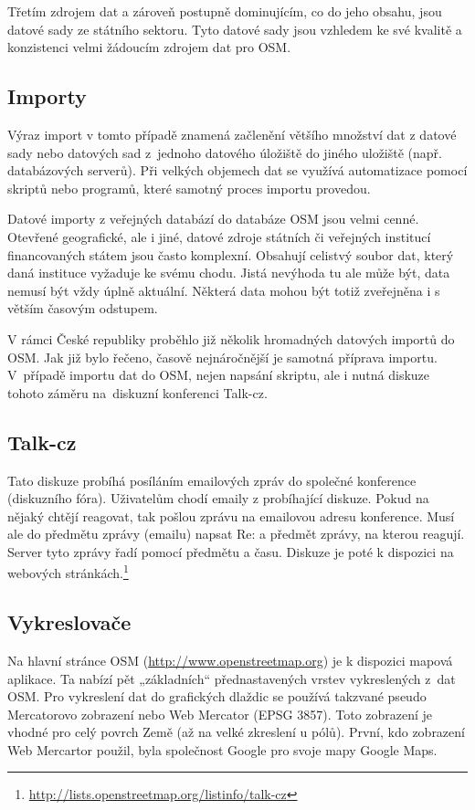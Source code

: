 Třetím zdrojem dat a zároveň postupně dominujícím, co do jeho obsahu, jsou
datové sady ze státního sektoru. Tyto datové sady jsou vzhledem ke své kvalitě a konzistenci velmi žádoucím zdrojem
dat pro OSM.

\subsection{Importy}
\label{Importy}
Výraz import v tomto případě znamená začlenění většího množství dat z datové sady nebo datových sad
z~jednoho datového úložiště do jiného uložiště (např. databázových serverů). Při velkých objemech dat
se využívá automatizace pomocí skriptů nebo programů, které samotný proces importu provedou.

Datové importy z veřejných databází do databáze OSM jsou velmi cenné. 
Otevřené geografické, ale i jiné, datové zdroje státních či veřejných institucí 
financovaných státem jsou často komplexní. Obsahují celistvý
soubor dat, který daná instituce vyžaduje ke svému chodu. Jistá nevýhoda tu 
ale může být, data nemusí být vždy úplně aktuální. Některá data mohou 
být totiž zveřejněna i s větším časovým odstupem.

V rámci České republiky proběhlo již několik hromadných datových importů do OSM. Jak 
již bylo řečeno, časově nejnáročnější je samotná příprava importu.
V~případě importu dat do OSM, nejen napsání skriptu, ale i nutná diskuze tohoto záměru
na~diskuzní konferenci Talk-cz. 

\subsection{Talk-cz}
\label{Talk-cz}
Tato diskuze probíhá posíláním emailových zpráv do společné konference (diskuzního fóra). 
Uživatelům chodí emaily z probíhající diskuze. Pokud na nějaký
chtějí reagovat, tak pošlou zprávu na emailovou adresu konference. Musí ale do předmětu zprávy (emailu) napsat Re: a předmět zprávy, na kterou reagují.
Server tyto zprávy řadí pomocí 
předmětu a času. Diskuze je poté k dispozici na webových stránkách.\footnote{\url{http://lists.openstreetmap.org/listinfo/talk-cz}}

\subsection{Vykreslovače}
\label{Vykreslovače}
Na hlavní stránce OSM (\url{http://www.openstreetmap.org}) je k dispozici mapová aplikace. Ta nabízí pět
„základních“ přednastavených vrstev vykreslených z~dat OSM.
Pro vykreslení dat do grafických dlaždic se používá takzvané pseudo Mercatorovo
zobrazení nebo Web Mercator (EPSG 3857). Toto zobrazení je vhodné pro celý povrch Země (až na velké zkreslení u pólů). 
První, kdo zobrazení Web Mercartor použil, byla společnost Google pro svoje mapy Google Maps.\cite{WebMercator}

